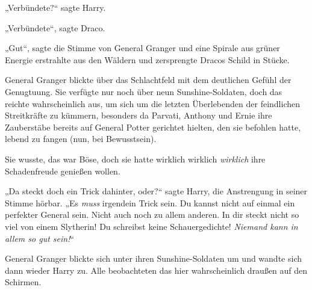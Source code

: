„Verbündete?“ sagte Harry.

„Verbündete“, sagte Draco.

„Gut“, sagte die Stimme von General Granger und eine Spirale aus grüner Energie erstrahlte aus den Wäldern und zersprengte Dracos Schild in Stücke.

\later

General Granger blickte über das Schlachtfeld mit dem deutlichen Gefühl der Genugtuung. Sie verfügte nur noch über neun Sunshine-Soldaten, doch das reichte wahrscheinlich aus, um sich um die letzten Überlebenden der feindlichen Streitkräfte zu kümmern, besonders da Parvati, Anthony und Ernie ihre Zauberstäbe bereits auf General Potter gerichtet hielten, den sie befohlen hatte, lebend zu fangen (nun, bei Bewusstsein).

Sie wusste, das war Böse, doch sie hatte wirklich wirklich \emph{wirklich} ihre Schadenfreude genießen wollen.

„Da steckt doch ein Trick dahinter, oder?“ sagte Harry, die Anstrengung in seiner Stimme hörbar. „Es \emph{muss} irgendein Trick sein. Du kannst nicht auf einmal ein perfekter General sein. Nicht auch noch zu allem anderen. In dir steckt nicht so viel von einem Slytherin! Du schreibst keine Schauergedichte! \emph{Niemand kann in allem so gut sein!}“

General Granger blickte sich unter ihren Sunshine-Soldaten um und wandte sich dann wieder Harry zu. Alle beobachteten das hier wahrscheinlich draußen auf den Schirmen.

